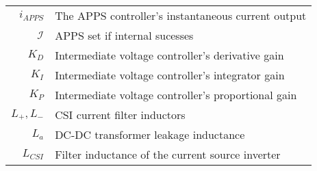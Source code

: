 \begin{scriptsize}
\begin{tabularx}{\textwidth}{r|X}
$i_{APPS}$												& The APPS controller's instantaneous current output\\	
$\mathcal{I}$               & APPS set if internal sucesses\\
$K_D$                & Intermediate voltage controller's derivative gain\\
$K_I$                & Intermediate voltage controller's integrator gain\\
$K_P$                & Intermediate voltage controller's proportional gain\\
$L_+,L_-$													& CSI current filter inductors\\
$L_a$															& DC-DC transformer leakage inductance\\
$L_{CSI}$															& Filter inductance of the current source inverter\\

\end{tabularx}
\end{scriptsize}
